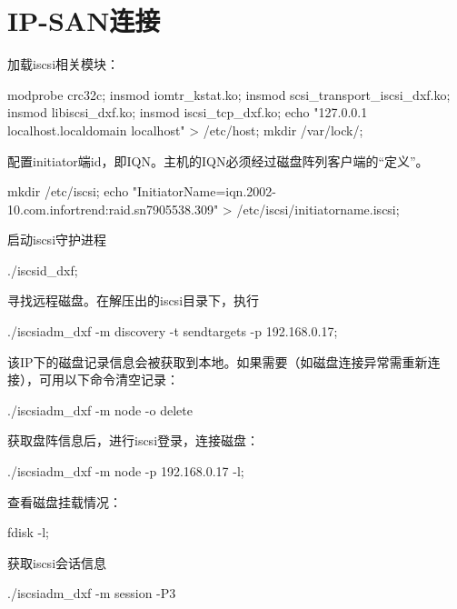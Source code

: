 \section{IP-SAN连接}
加载iscsi相关模块：
\begin{shellcmd}
modprobe crc32c;
insmod iomtr_kstat.ko;
insmod scsi_transport_iscsi_dxf.ko;
insmod libiscsi_dxf.ko;
insmod iscsi_tcp_dxf.ko;
echo "127.0.0.1       localhost.localdomain   localhost" > /etc/host;
mkdir /var/lock/;
\end{shellcmd}

配置initiator端id，即IQN。主机的IQN必须经过磁盘阵列客户端的“定义”。
\begin{shellcmd}
mkdir /etc/iscsi;
echo "InitiatorName=iqn.2002-10.com.infortrend:raid.sn7905538.309" > /etc/iscsi/initiatorname.iscsi;
\end{shellcmd}

启动iscsi守护进程
\begin{shellcmd}
./iscsid_dxf;
\end{shellcmd}

寻找远程磁盘。在解压出的iscsi目录下，执行
\begin{shellcmd}
./iscsiadm_dxf -m discovery -t sendtargets -p 192.168.0.17;
\end{shellcmd}

该IP下的磁盘记录信息会被获取到本地。如果需要（如磁盘连接异常需重新连接），可用以下命令清空记录：
\begin{shellcmd}
./iscsiadm_dxf -m node -o delete
\end{shellcmd}

获取盘阵信息后，进行iscsi登录，连接磁盘：
\begin{shellcmd}
./iscsiadm_dxf -m node  -p 192.168.0.17 -l;
\end{shellcmd}

查看磁盘挂载情况：
\begin{shellcmd}
fdisk -l;
\end{shellcmd}

获取iscsi会话信息
\begin{shellcmd}
./iscsiadm_dxf -m session -P3
\end{shellcmd}




